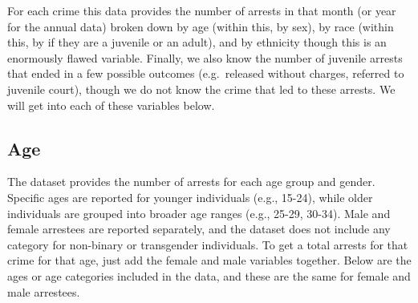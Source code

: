 \documentclass[
]{krantz}
\begin{document}
For each crime this data provides the number of arrests in
that month (or year for the annual data) broken down by age
(within this, by sex), by race (within this, by if they are
a juvenile or an adult), and by ethnicity though this is an
enormously flawed variable. Finally, we also know the number
of juvenile arrests that ended in a few possible outcomes
(e.g.~released without charges, referred to juvenile court),
though we do not know the crime that led to these arrests.
We will get into each of these variables below.

\subsection{Age}\label{age}

The dataset provides the number of arrests for each age
group and gender. Specific ages are reported for younger
individuals (e.g., 15-24), while older individuals are
grouped into broader age ranges (e.g., 25-29, 30-34). Male
and female arrestees are reported separately, and the
dataset does not include any category for non-binary or
transgender individuals. To get a total arrests for that
crime for that age, just add the female and male variables
together. Below are the ages or age categories included in
the data, and these are the same for female and male
arrestees.
\end{document}
